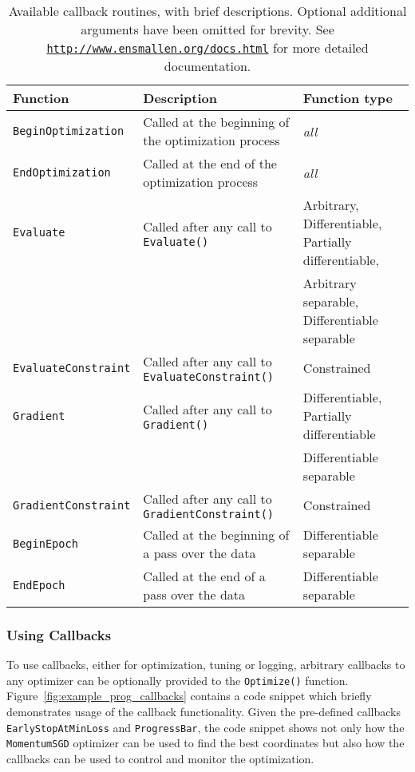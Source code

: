 \begin{table}[t!]
\centering
\small
\begin{tabular}{lll}
\toprule
{\bf Function} & {\bf Description} & {\bf Function type} \\
\hline
\texttt{BeginOptimization}   & Called at the beginning of the optimization process  & {\it all} \\
\texttt{EndOptimization}     & Called at the end of the optimization process & {\it all} \\
\texttt{Evaluate}            & Called after any call to {\tt Evaluate()}            & Arbitrary, Differentiable, Partially differentiable,  \\
                             &                                                      & Arbitrary separable, Differentiable separable \\
\texttt{EvaluateConstraint}  & Called after any call to {\tt EvaluateConstraint()}  & Constrained \\
\texttt{Gradient}            & Called after any call to {\tt Gradient()}            & Differentiable, Partially differentiable \\
                             &                                                      & Differentiable separable \\
\texttt{GradientConstraint}  & Called after any call to {\tt GradientConstraint()}  & Constrained \\
\texttt{BeginEpoch}          & Called at the beginning of a pass over the data      & Differentiable separable \\
\texttt{EndEpoch}            & Called at the end of a pass over the data            & Differentiable separable \\

\bottomrule
\end{tabular}
\vspace{0.5ex}
\caption
  {
  Available callback routines, with brief descriptions.
  Optional additional arguments have been omitted for brevity.
  See {\href{http://www.ensmallen.org/docs.html}{\mbox{\tt http://www.ensmallen.org/docs.html}}} for more detailed documentation.
  }
\label{tab:callback_list}
\end{table}


\subsubsection{Using Callbacks}

To use callbacks, either for optimization, tuning or logging, 
arbitrary callbacks to any optimizer can be optionally provided
to the {\tt Optimize()} function.
Figure~\ref{fig:example_prog_callbacks} contains a code snippet which
briefly demonstrates usage of the callback functionality.  Given the pre-defined
callbacks {\tt EarlyStopAtMinLoss} and {\tt ProgressBar}, the code snippet shows
not only how the {\tt MomentumSGD} optimizer can be used to find the best
coordinates but also how the callbacks can be used to control and monitor the
optimization.

